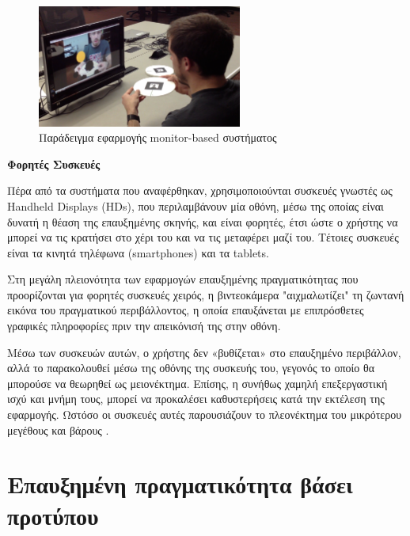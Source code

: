 \begin{figure}[H]
    \centering
    \includegraphics[width=0.6\textwidth]{Files/Figures/monitor_example.png}
    \caption[Παράδειγμα εφαρμογής Monitor-based συστήματος ]{ Παράδειγμα εφαρμογής monitor-based συστήματος \cite{monitor_ar}}
    \label{fig:monitor_example}
\end{figure}


\textbf{Φορητές Συσκευές}


Πέρα από τα συστήματα που αναφέρθηκαν, χρησιμοποιούνται συσκευές γνωστές ως Handheld Displays (HDs), που περιλαμβάνουν μία οθόνη, μέσω της οποίας είναι δυνατή η θέαση της επαυξημένης σκηνής, και είναι φορητές, έτσι ώστε ο χρήστης να μπορεί να τις κρατήσει στο χέρι του και να τις μεταφέρει μαζί του. Τέτοιες συσκευές είναι τα κινητά τηλέφωνα (smartphones) και τα tablets.

Στη μεγάλη πλειονότητα των εφαρμογών επαυξημένης πραγματικότητας που προορίζονται για φορητές συσκευές χειρός, η βιντεοκάμερα "αιχμαλωτίζει" τη ζωντανή εικόνα του πραγματικού περιβάλλοντος, η οποία επαυξάνεται με επιπρόσθετες γραφικές πληροφορίες πριν την απεικόνισή της στην οθόνη.  


Μέσω των συσκευών αυτών, ο χρήστης δεν «βυθίζεται» στο επαυξημένο περιβάλλον, αλλά το παρακολουθεί μέσω της οθόνης της συσκευής του, γεγονός το οποίο θα μπορούσε να θεωρηθεί ως μειονέκτημα. Επίσης, η συνήθως χαμηλή επεξεργαστική ισχύ και μνήμη τους, μπορεί να προκαλέσει καθυστερήσεις κατά την εκτέλεση της εφαρμογής. Ωστόσο οι συσκευές αυτές παρουσιάζουν το πλεονέκτημα του μικρότερου μεγέθους και βάρους \cite{arth2015history} \cite{wagner2007handheld}  .





\section{Επαυξημένη πραγματικότητα βάσει προτύπου}



